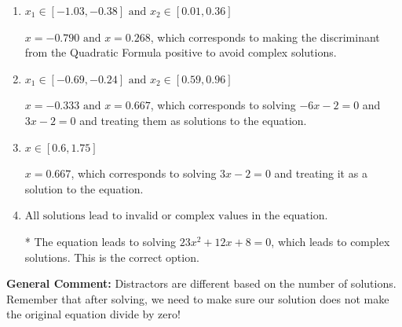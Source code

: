 \documentclass{extbook}[14pt]
\begin{document}
\begin{enumerate}
{\begin{enumerate}[label=\Alph*.]
$x = -0.333$, which corresponds to solving $-6x -2 = 0$ and treating it as a solution to the equation.
\item \( x_1 \in [-1.03, -0.38] \text{ and } x_2 \in [0.01,0.36] \)

$x = -0.790 \text{ and } x = 0.268$, which corresponds to making the discriminant from the Quadratic Formula positive to avoid complex solutions.
\item \( x_1 \in [-0.69, -0.24] \text{ and } x_2 \in [0.59,0.96] \)

$x = -0.333 \text{ and } x = 0.667$, which corresponds to solving $-6x -2 = 0$ and $3x -2 = 0$ and treating them as solutions to the equation.
\item \( x \in [0.6,1.75] \)

$x = 0.667$, which corresponds to solving $3x -2 = 0$ and treating it as a solution to the equation.
\item \( \text{All solutions lead to invalid or complex values in the equation.} \)

* The equation leads to solving $23x^{2} +12 x + 8=0$, which leads to complex solutions. This is the correct option.
\end{enumerate}

\textbf{General Comment:} Distractors are different based on the number of solutions. Remember that after solving, we need to make sure our solution does not make the original equation divide by zero!
}
\end{enumerate}
\end{document}
